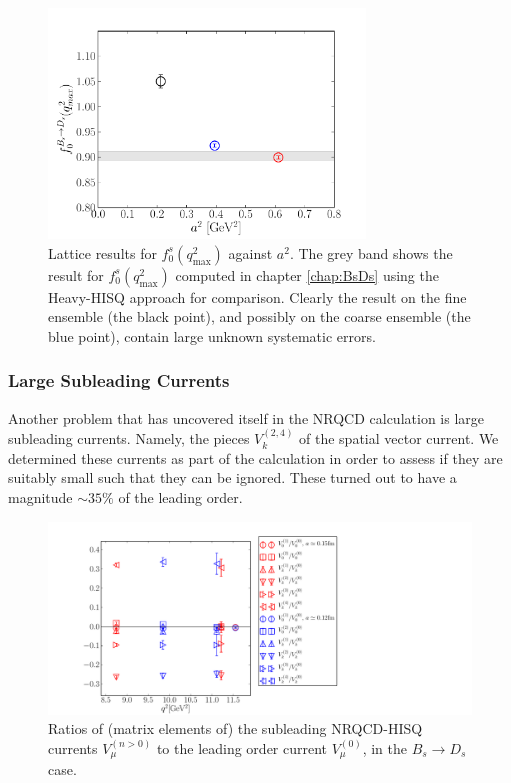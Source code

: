 \begin{figure}[htb!]
  \vspace{-20pt}
  \begin{center}
    \includegraphics[width=0.75\textwidth]{images/nrqcd/BsDs_f0q2max.pdf}
  \end{center}
  \caption{Lattice results for $f_0^s(q^2_{\text{max}})$ against $a^2$. The grey band shows the result for $f_0^s(q^2_{\text{max}})$ computed in chapter \ref{chap:BsDs} using the Heavy-HISQ approach for comparison. Clearly the result on the fine ensemble (the black point), and possibly on the coarse ensemble (the blue point), contain large unknown systematic errors. \label{fig:BsDs_f0q2max}}

\end{figure}

\subsubsection{Large Subleading Currents}
\label{sec:largesubleadingcurrents}

Another problem that has uncovered itself in the NRQCD calculation is large subleading currents. Namely, the pieces $V^{(2,4)}_k$ of the spatial vector current. We determined these currents as part of the calculation in order to assess if they are suitably small such that they can be ignored. These turned out to have a magnitude $\sim 35\%$ of the leading order.

\begin{figure}[htb!]
  \begin{center}
    \includegraphics[width=1.2\textwidth]{images/nrqcd/BsDs_currentratios.pdf}
  \end{center}
  \caption{Ratios of (matrix elements of) the subleading NRQCD-HISQ currents $V_{\mu}^{(n>0)}$ to the leading order current $V_{\mu}^{(0)}$, in the $B_s\to D_s$ case. \label{eq:currentratios}}
\end{figure}

